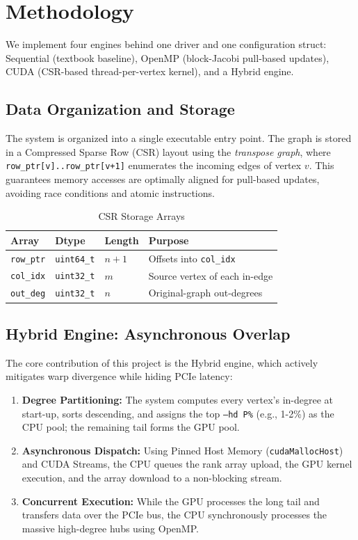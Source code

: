 \documentclass[12pt,a4paper]{article}
\begin{document}
	\section{Methodology}
	We implement four engines behind one driver and one configuration struct: Sequential (textbook baseline), OpenMP (block-Jacobi pull-based updates), CUDA (CSR-based thread-per-vertex kernel), and a Hybrid engine. 

    \subsection{Data Organization and Storage}
    The system is organized into a single executable entry point. The graph is stored in a Compressed Sparse Row (CSR) layout using the \textit{transpose graph}, where \texttt{row\_ptr[v]..row\_ptr[v+1]} enumerates the incoming edges of vertex $v$. This guarantees memory accesses are optimally aligned for pull-based updates, avoiding race conditions and atomic instructions.

    \begin{longtable}[htp]{|p{2.5cm}|p{2.5cm}|p{2.5cm}|p{5cm}|}
    \caption{CSR Storage Arrays}
    \label{tab:storage} \\
    \toprule \textbf{Array} & \textbf{Dtype} & \textbf{Length} & \textbf{Purpose} \\
    \midrule \texttt{row\_ptr} & \texttt{uint64\_t} & $n+1$ & Offsets into \texttt{col\_idx} \\
    \midrule \texttt{col\_idx} & \texttt{uint32\_t} & $m$ & Source vertex of each in-edge \\
    \midrule \texttt{out\_deg} & \texttt{uint32\_t} & $n$ & Original-graph out-degrees \\
    \bottomrule
    \end{longtable}

    \subsection{Hybrid Engine: Asynchronous Overlap}
    The core contribution of this project is the Hybrid engine, which actively mitigates warp divergence while hiding PCIe latency:
    \begin{enumerate}
        \item \textbf{Degree Partitioning:} The system computes every vertex's in-degree at start-up, sorts descending, and assigns the top \texttt{--hd P\%} (e.g., 1-2\%) as the CPU pool; the remaining tail forms the GPU pool.
        \item \textbf{Asynchronous Dispatch:} Using Pinned Host Memory (\texttt{cudaMallocHost}) and CUDA Streams, the CPU queues the rank array upload, the GPU kernel execution, and the array download to a non-blocking stream.
        \item \textbf{Concurrent Execution:} While the GPU processes the long tail and transfers data over the PCIe bus, the CPU synchronously processes the massive high-degree hubs using OpenMP.
    \end{enumerate}
\end{document}
